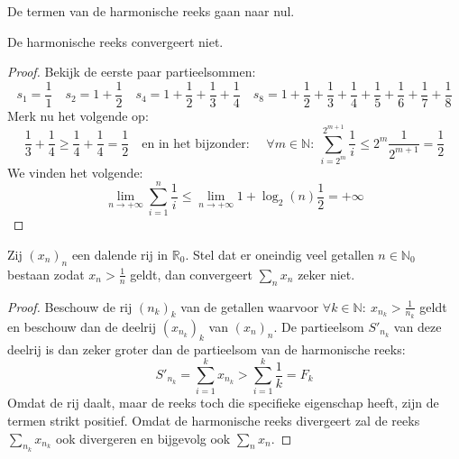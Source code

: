 \documentclass[main.tex]{subfiles}
\begin{document}
\begin{st}
  \label{st:termen-harmonische-reeks-naar-nul}
  De termen van de harmonische reeks gaan naar nul.
\end{st}

\begin{st}
  De harmonische reeks convergeert niet.

  \begin{proof}
    Bekijk de eerste paar partieelsommen:
    \[
    s_{1} = \frac{1}{1}\quad
    s_{2} = 1 + \frac{1}{2}\quad
    s_{4} = 1 + \frac{1}{2} + \frac{1}{3} + \frac{1}{4}\quad
    s_{8} = 1 + \frac{1}{2} + \frac{1}{3} + \frac{1}{4} + \frac{1}{5} + \frac{1}{6} + \frac{1}{7} + \frac{1}{8}
    \]
    Merk nu het volgende op:
    \[ \frac{1}{3} + \frac{1}{4} \ge \frac{1}{4} + \frac{1}{4} = \frac{1}{2} \quad\text{en in het bijzonder: }\quad \forall m\in \mathbb{N}:\ \sum_{i=2^{m}}^{2^{m+1}}\frac{1}{i} \le 2^{m}\frac{1}{2^{m+1}} = \frac{1}{2} \]
    We vinden het volgende:
    \[ \lim_{n\rightarrow +\infty}\sum_{i=1}^{n}\frac{1}{i} \le \lim_{n\rightarrow +\infty} 1+ \log_{2}(n)\frac{1}{2} = +\infty \]
\feed
  \end{proof}
\end{st}

\begin{st}
  Zij $(x_{n})_{n}$ een dalende rij in $\mathbb{R}_{0}$.
  Stel dat er oneindig veel getallen $n\in\mathbb{N}_{0}$ bestaan zodat $x_{n} > \frac{1}{n}$ geldt, dan convergeert $\sum_{n}x_{n}$ zeker niet.

  \begin{proof}
    Beschouw de rij $(n_{k})_{k}$ van de getallen waarvoor $\forall k\in\mathbb{N}:\ x_{n_{k}} > \frac{1}{n_{k}}$ geldt en beschouw dan de deelrij $(x_{n_{k}})_{k}$ van $(x_{n})_{n}$.
    De partieelsom $S'_{n_{k}}$ van deze deelrij is dan zeker groter dan de partieelsom van de harmonische reeks:
    \[ S'_{n_{k}} = \sum_{i=1}^{k}x_{n_{k}} > \sum_{i=1}^{k}\frac{1}{k} = F_{k}  \]
    Omdat de rij daalt, maar de reeks toch die specifieke eigenschap heeft, zijn de termen strikt positief.
    Omdat de harmonische reeks divergeert zal de reeks $\sum_{n_{k}}x_{n_{k}}$ ook divergeren en bijgevolg ook $\sum_{n}x_{n}$.
\feed
  \end{proof}
\end{st}
\end{document}
